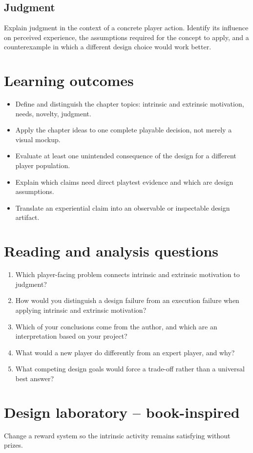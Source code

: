 \documentclass[11pt]{article}
\begin{document}
\subsection{Judgment}
Explain judgment in the context of a concrete player action. Identify its influence on perceived experience, the assumptions required for the concept to apply, and a counterexample in which a different design choice would work better.


\section{Learning outcomes}
\begin{itemize}
\item Define and distinguish the chapter topics: intrinsic and extrinsic motivation, needs, novelty, judgment.
\item Apply the chapter ideas to one complete playable decision, not merely a visual mockup.
\item Evaluate at least one unintended consequence of the design for a different player population.
\item Explain which claims need direct playtest evidence and which are design assumptions.
\item Translate an experiential claim into an observable or inspectable design artifact.
\end{itemize}

\section{Reading and analysis questions}
\begin{enumerate}
\item Which player-facing problem connects intrinsic and extrinsic motivation to judgment?
\item How would you distinguish a design failure from an execution failure when applying intrinsic and extrinsic motivation?
\item Which of your conclusions come from the author, and which are an interpretation based on your project?
\item What would a new player do differently from an expert player, and why?
\item What competing design goals would force a trade-off rather than a universal best answer?
\end{enumerate}

\section{Design laboratory -- book-inspired}
Change a reward system so the intrinsic activity remains satisfying without prizes.
\end{document}
